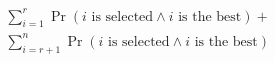 \documentclass[preview]{standalone}
\begin{document}
\begin{align*}
\sum_{i=1}^{r} \Pr(i \text{ is selected} \land i \text{ is the best}) + \\ \sum_{i=r+1}^{n} \Pr(i \text{ is selected} \land i \text{ is the best})
\end{align*}
\end{document}
